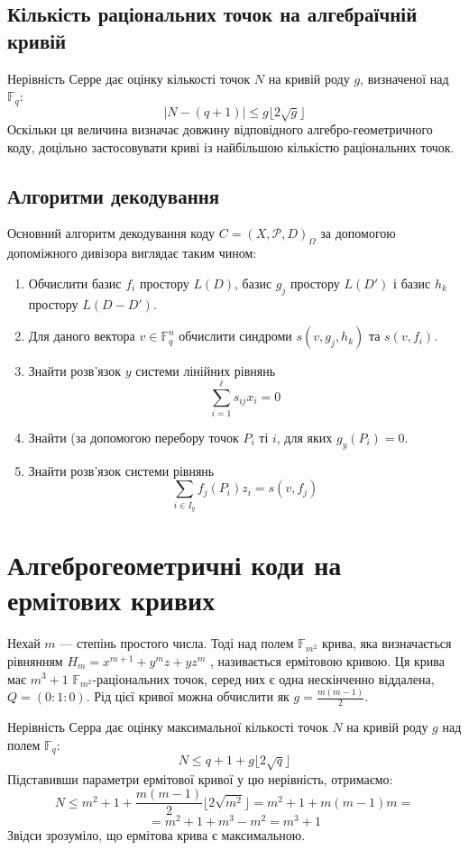 \documentclass[a4paper,12pt,oneside]{article}
\begin{document}
\subsection{Кількість раціональних точок на алгебраїчній кривій}
Нерівність Серре дає оцінку кількості точок $N$ на кривій роду $g$, визначеної над $\mathbb{F}_q$:
$$|N-(q+1)| \le g \lfloor 2 \sqrt{g} \rfloor$$
Оскільки ця величина визначає довжину відповідного алгебро-геометричного коду, доцільно застосовувати криві із найбільшою кількістю 
раціональних точок.

\subsection{Алгоритми декодування}
Основний алгоритм декодування коду $C = (X, \mathcal{P}, D)_{\Omega}$ за допомогою допоміжного дивізора виглядає таким чином:
\begin{enumerate}
    \item Обчислити базис ${f_i}$ простору $L(D)$, базис ${g_j}$ простору $L(D')$ і базис ${h_k}$ простору $L(D-D')$.
    \item Для даного вектора $v \in \mathbb{F}_q^n$ обчислити синдроми $s(v, g_j, h_k)$ та $s(v, f_i)$.
    \item Знайти розв'язок $y$ системи лінійних рівнянь
        $$\sum_{i=1}^\ell s_{ij} x_i = 0$$
    \item Знайти (за допомогою перебору точок $P_i$ ті $i$, для яких $g_y(P_i) = 0$.
    \item Знайти розв'язок системи рівнянь
        $$\sum_{i \in I_y} f_j(P_i)z_i = s(v, f_j)$$
\end{enumerate}

\section{Алгеброгеометричні коди на ермітових кривих}
Нехай $m$ --- степінь простого числа. Тоді над полем $\mathbb{F}_{m^2}$ крива, яка визначається рівнянням $H_m = x^{m+1} + y^m z + y z^m$ ,
називається ермітовою кривою. Ця крива має $m^3+1$ $\mathbb{F}_{m^2}$-раціональних точок, серед них є одна нескінченно віддалена, 
$Q = (0:1:0)$. Рід цієї кривої можна обчислити як $g = \frac{m(m-1)}{2}$.

Нерівність Серра дає оцінку максимальної кількості точок $N$ на кривій роду $g$ над полем $\mathbb{F}_q$:
$$ N \le q+1+g \lfloor 2 \sqrt{q} \rfloor $$
Підставивши параметри ермітової кривої у цю нерівність, отримаємо:
$$ N \le m^2 + 1 + \frac{m(m-1)}{2} \lfloor 2 \sqrt{m^2} \rfloor= m^2 + 1 + m(m-1)m = $$
$$ = m^2 + 1 + m^3 - m^2 = m^3 + 1$$
Звідси зрозуміло, що ермітова крива є максимальною.
\end{document}
